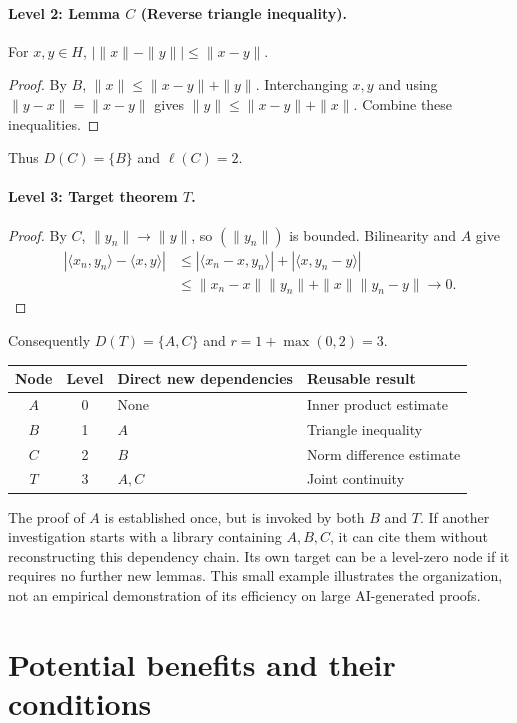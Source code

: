 \documentclass[11pt,a4paper]{article}
\theoremstyle{definition}\newtheorem{definition}{Definition}
\begin{document}
\paragraph{Level 2: Lemma $C$ (Reverse triangle inequality).} For $x,y\in H$, $|\|x\|-\|y\||\le\|x-y\|$.
\begin{proof}
By $B$, $\|x\|\le\|x-y\|+\|y\|$. Interchanging $x,y$ and using $\|y-x\|=\|x-y\|$ gives $\|y\|\le\|x-y\|+\|x\|$. Combine these inequalities.
\end{proof}
Thus $D(C)=\{B\}$ and $\ell(C)=2$.

\paragraph{Level 3: Target theorem $T$.}
\begin{proof}
By $C$, $\|y_n\|\to\|y\|$, so $(\|y_n\|)$ is bounded. Bilinearity and $A$ give
\begin{align*}
 |\langle x_n,y_n\rangle-\langle x,y\rangle|
 &\le |\langle x_n-x,y_n\rangle|+|\langle x,y_n-y\rangle|\\
 &\le\|x_n-x\|\|y_n\|+\|x\|\|y_n-y\|\to0.
\end{align*}
\end{proof}
Consequently $D(T)=\{A,C\}$ and $r=1+\max(0,2)=3$.
\begin{center}\small
\begin{tabular}{ccll}\toprule
Node&Level&Direct new dependencies&Reusable result\\\midrule
$A$&0&None&Inner product estimate\\
$B$&1&$A$&Triangle inequality\\
$C$&2&$B$&Norm difference estimate\\
$T$&3&$A,C$&Joint continuity\\\bottomrule
\end{tabular}
\end{center}
The proof of $A$ is established once, but is invoked by both $B$ and $T$. If another investigation starts with a library containing $A,B,C$, it can cite them without reconstructing this dependency chain. Its own target can be a level-zero node if it requires no further new lemmas. This small example illustrates the organization, not an empirical demonstration of its efficiency on large AI-generated proofs.

\section{Potential benefits and their conditions}
\end{document}
